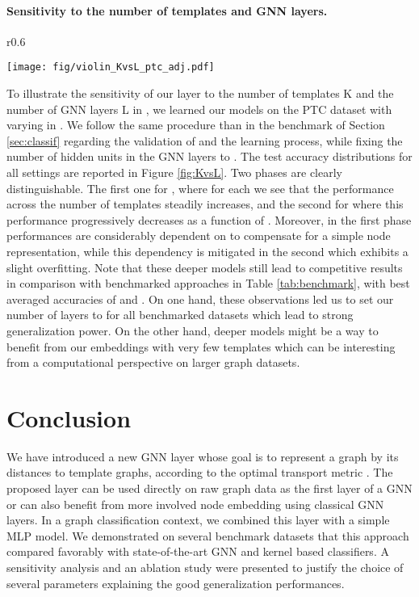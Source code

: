 \documentclass{article}
\begin{document}
{\paragraph{Sensitivity to the number of templates and GNN layers.}
\begin{wrapfigure}{r}{0.6\textwidth}  \vspace{-6mm}
	\begin{center}
		\texttt{[image: fig/violin\_KvsL\_ptc\_adj.pdf]}
	\end{center}
	\caption{\label{fig:KvsL}Test accuracy distributions by number of templates and number of GNN layers.\vspace{-2mm}}
\end{wrapfigure}
 To illustrate the sensitivity of our  layer to the number of templates K
 and the number of GNN layers L in , we learned our models on the PTC dataset with  varying in . We follow the same
 procedure than in the benchmark of Section \ref{sec:classif} regarding the
 validation of  and the learning process, while fixing the number of hidden
 units in the GNN layers to . The test accuracy distributions for all settings
 are reported in Figure \ref{fig:KvsL}. Two phases are clearly distinguishable.
 The first one for , where for each  we see that the performance
 across the number of templates steadily increases, and the second for 
 where this performance progressively decreases as a function of . Moreover, in the first phase
 performances are considerably dependent on  to compensate for a simple node representation, while this dependency is
 mitigated in the second which exhibits a slight overfitting. Note that these deeper
 models still lead to competitive results in comparison with benchmarked
 approaches in Table \ref{tab:benchmark}, with best averaged accuracies of
   and  . On one hand, these observations led us to
 set our number of layers to  for all benchmarked datasets which lead to strong generalization power. On the other hand, deeper models might be a way to
 benefit from our  embeddings with very few templates which can be
 interesting from a computational perspective on larger graph datasets. 	\label{sec:experiments}
	
	\section{Conclusion}
	



We have introduced a new GNN layer whose goal is to represent a graph by its distances to template graphs, according to the optimal transport metric . The proposed layer can be used directly on raw graph data as the first layer of a GNN or can also
benefit from more involved node embedding using classical GNN layers. In a graph classification context, we combined this  layer with a simple MLP model. We demonstrated on several benchmark datasets that this approach compared favorably with
state-of-the-art GNN and kernel based classifiers. A sensitivity analysis and an ablation study were presented to justify the
choice of several parameters explaining the good generalization performances.  

}
\end{document}
